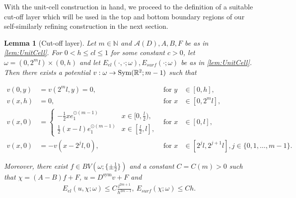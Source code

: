 \documentclass[a4paper, 10pt, twoside, notitlepage]{amsart}
\theoremstyle{plain}
\newtheorem{lem}[prop]{Lemma}
\newcommand{\R}{\mathbb{R}}
\newcommand{\N}{\mathbb{N}}
\newcommand{\A}{\mathcal{A}}
\newcommand{\Ds}{D^{\text{sym}}}
\begin{document}
		With the unit-cell construction in hand, we proceed to the definition of a suitable cut-off layer which will be used in the top and bottom boundary regions of our self-similarly refining construction in the next section.
		
		\begin{lem}[Cut-off layer] \label{lem:UpperCutOff} Let $m \in \N$ and $\A(D),A,B, F$ be as in \cref{lem:UnitCell}.  For $0 < h \leq c l \leq 1$ for some constant $c > 0$, let
                  $\omega = (0,2^ml) \times (0,h)$ and let $E_{el}(\cdot,\cdot;\omega),E_{surf}(\cdot;\omega)$ be as in \cref{lem:UnitCell}.  Then there exists a potential $v: \omega \to \textup{Sym}(\R^2;m-1)$ such that
                  
                    \begin{align*}
                      v(0,y) & = v(2^ml,y) = 0, &\text{for } y & \in [0,h],\\
                      v(x,h) & = 0, &\text{for } x &\in [0,2^ml], \\
                      v(x,0) & = \begin{cases} -\frac{1}{2}x e_1^{\odot (m-1)} & x \in [0,\frac{l}{2}), \\  \frac{1}{2}(x-l) e_1^{\odot (m-1)} & x \in [\frac{l}{2},l],\end{cases} &\text{for } x &\in [0,l], \\
                      v(x,0) & = - v(x-2^jl,0), & \text{for } x &\in [2^jl,2^{j+1}l], j\in\{0,1,\dots,m-1\}.
			\end{align*}
                        
			Moreover, there exist $f \in BV(\omega;\{\pm \frac{1}{2}\})$ and a constant $C = C(m)>0$ such that $\chi = (A-B)f + F$, $u = \Ds v + F$ and
			\begin{align*}
				E_{el}(u,\chi;\omega) \leq C \frac{l^{2m+1}}{h^{2m-1}}, \ E_{surf}(\chi;\omega) \leq C h.
			\end{align*}
                      \end{lem}
		
\end{document}

